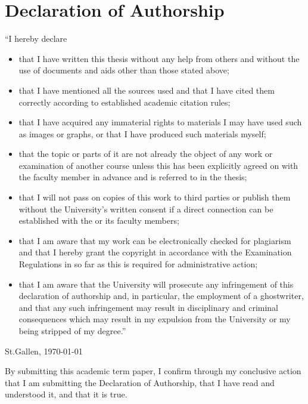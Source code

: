 \newpage
\thispagestyle{empty}

\section*{Declaration of Authorship}
“I hereby declare
\begin{itemize}
	\item that I have written this thesis without any help from others and without the use of documents and aids other than those stated above;

	\item that I have mentioned all the sources used and that I have cited them correctly according to established academic citation rules;

	\item that I have acquired any immaterial rights to materials I may have used such as images or graphs, or that I have produced such materials myself;

	\item that the topic or parts of it are not already the object of any work or examination of another course unless this has been explicitly agreed on with the faculty member in advance and is referred to in the thesis;

	\item that I will not pass on copies of this work to third parties or publish them without the University’s written consent if a direct connection can be established with the  or its faculty members;

	\item that I am aware that my work can be electronically checked for plagiarism and that I hereby grant the copyright in accordance with the Examination Regulations in so far as this is required for administrative action;

	\item that I am aware that the University will prosecute any infringement of this declaration of authorship and, in particular, the employment of a ghostwriter, and that any such infringement may result in disciplinary and criminal consequences which may result in my expulsion from the University or my being stripped of my degree.”


\end{itemize}

\vspace{1cm}

\begin{minipage}{6.5cm}
\dotfill
\end{minipage} %
\newline
St.Gallen, \today

\scriptsize{By submitting this academic term paper, I confirm through my conclusive action that I am submitting the Declaration of Authorship, that I have read and understood it, and that it is true.}
